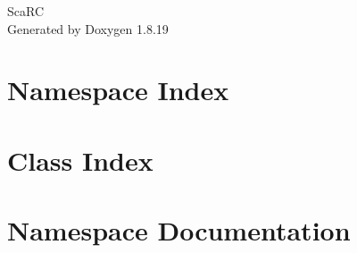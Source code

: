 \let\mypdfximage\pdfximage\def\pdfximage{\immediate\mypdfximage}\documentclass[twoside]{book}
\newcommand{\+}{\discretionary{\mbox{\scriptsize$\hookleftarrow$}}{}{}}
\newcommand{\clearemptydoublepage}{%
  \newpage{\pagestyle{empty}\cleardoublepage}%
}
\begin{document}
\hypersetup{pageanchor=false,
             bookmarksnumbered=true,
             pdfencoding=unicode
            }
\begin{titlepage}
\vspace*{7cm}
\begin{center}%
{\Large Sca\+RC }\\
\vspace*{1cm}
{\large Generated by Doxygen 1.8.19}\\
\end{center}
\end{titlepage}
\clearemptydoublepage
{}
\tableofcontents
\clearemptydoublepage
{}
\hypersetup{pageanchor=true}

\chapter{Namespace Index}

\chapter{Class Index}

\chapter{Namespace Documentation}






\end{document}
